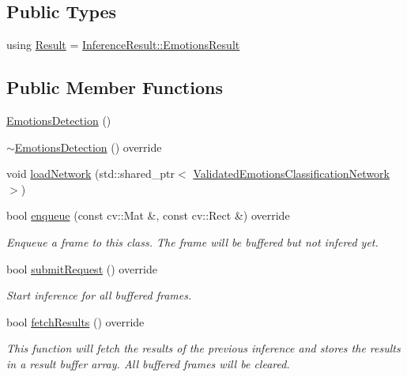 \subsection*{Public Types}
\begin{DoxyCompactItemize}
\item 
using \hyperlink{classopenvino__service_1_1EmotionsDetection_afa51d5786d9296111bda1b928e87afa8}{Result} = \hyperlink{structInferenceResult_1_1EmotionsResult}{Inference\+Result\+::\+Emotions\+Result}
\end{DoxyCompactItemize}
\subsection*{Public Member Functions}
\begin{DoxyCompactItemize}
\item 
\hyperlink{classopenvino__service_1_1EmotionsDetection_af39351c4a6c366007bf523d569855cd9}{Emotions\+Detection} ()
\item 
\hyperlink{classopenvino__service_1_1EmotionsDetection_a7eeb58a704c56aa0f2f73b980cb44ac5}{$\sim$\+Emotions\+Detection} () override
\item 
void \hyperlink{classopenvino__service_1_1EmotionsDetection_af76ffdb8f2a97006b522b13a77488f5e}{load\+Network} (std\+::shared\+\_\+ptr$<$ \hyperlink{classValidatedEmotionsClassificationNetwork}{Validated\+Emotions\+Classification\+Network} $>$)
\item 
bool \hyperlink{classopenvino__service_1_1EmotionsDetection_a170516f06ee4b84f378869b3addc8740}{enqueue} (const cv\+::\+Mat \&, const cv\+::\+Rect \&) override
\begin{DoxyCompactList}\small\item\em Enqueue a frame to this class. The frame will be buffered but not infered yet. \end{DoxyCompactList}\item 
bool \hyperlink{classopenvino__service_1_1EmotionsDetection_ab4a36bef8e7b0af39f7965cf8c5f9d7b}{submit\+Request} () override
\begin{DoxyCompactList}\small\item\em Start inference for all buffered frames. \end{DoxyCompactList}\item 
bool \hyperlink{classopenvino__service_1_1EmotionsDetection_af2af5cf3315347dfbd81008e9987a97c}{fetch\+Results} () override
\begin{DoxyCompactList}\small\item\em This function will fetch the results of the previous inference and stores the results in a result buffer array. All buffered frames will be cleared. \end{DoxyCompactList}\item 

\end{DoxyCompactItemize}
